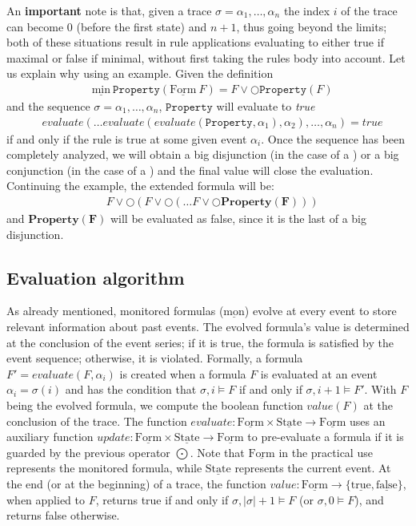 \documentclass[english]{article}
\begin{document}
An \textbf{important} note is that, given a trace $\sigma=\alpha_{1},\ldots ,\alpha_{n}$ the index $i$ of the trace can become $0$ (before the first state) and $n+1$, thus going beyond the limits; both of these situations result in rule applications evaluating to either true if maximal or false if minimal, without first taking the rules body into account. Let us explain why using an example. Given the definition 
\begin{align*}
    & \underline{\text{min}}\ \mathtt{Property}(\underline{\text{Form}}\ F) =F \lor \bigcirc \mathtt{Property}(F)
\end{align*}
and the sequence $\sigma=\alpha_{1},\ldots ,\alpha_{n}$, $\mathtt{Property}$ will evaluate to \textit{true} 
\begin{align*}
    & evaluate(\ldots evaluate(evaluate(\mathtt{Property},\alpha_1),\alpha_2),\ldots,\alpha_n)=true
\end{align*}
if and only if the rule is true at some given event $\alpha_i$. 
Once the sequence has been completely analyzed, we will obtain a big disjunction (in the case of a \underline{}) or a big conjunction (in the case of a \underline{}) and the final value will close the evaluation. Continuing the example, the extended formula will be:
\begin{align*}
    & F \lor \bigcirc(F \lor \bigcirc(\ldots F \lor \bigcirc \mathbf{Property(F)})) 
\end{align*}
and $\mathbf{Property(F)}$ will be evaluated as false, since it is the last of a big disjunction.
\subsection{Evaluation algorithm}\label{algo}
As already mentioned, monitored formulas ($\underline{\text{mon}}$) evolve at every event to store relevant information about past events. The evolved formula's value is determined at the conclusion of the event series; if it is true, the formula is satisfied by the event sequence; otherwise, it is violated. Formally, a formula $F' = evaluate(F, \alpha_i)$ is created when a formula $F$ is evaluated at an event $\alpha_i = \sigma(i)$ and has the condition that $\sigma, i \models F$ if and only if $\sigma, i+1 \models F'$. With $F$ being the evolved formula, we compute the boolean function $value(F)$ at the conclusion of the trace. The function $evaluate: \underline{\text{Form}} \times \underline{\text{State}} \to \underline{\text{Form}}$ uses an auxiliary function $update: \underline{\text{Form}} \times \underline{\text{State}} \to \underline{\text{Form}}$ to pre-evaluate a formula if it is guarded by the previous operator $\bigodot$. Note that $\underline{\text{Form}}$ in the practical use represents the monitored formula, while $\underline{\text{State}}$ represents the current event. At the end (or at the beginning) of a trace, the
function $value : \underline{\text{Form}} \rightarrow \{ \underline{\text{true}}, \underline{\text{false}} \}$, when applied to $F$, returns true if and only if $\sigma,|\sigma|+1 \models F$ (or $\sigma,0 \models F$), and returns false otherwise.
\end{document}
